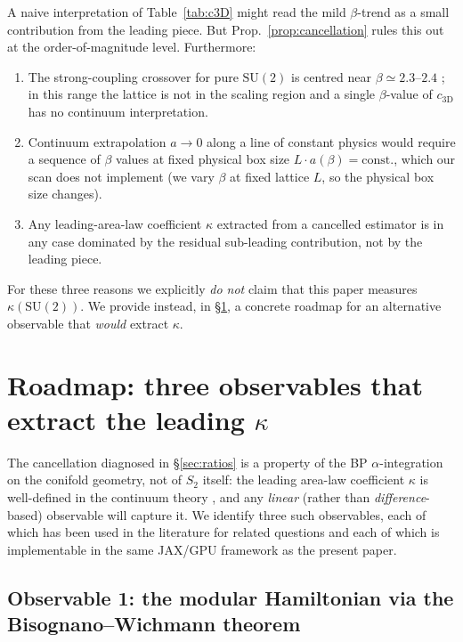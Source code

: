 \documentclass[11pt,a4paper]{article}
\theoremstyle{definition}
\newcommand{\SUtwo}{\mathrm{SU}(2)}
\newcommand{\threeD}{{3\text{D}}}
\begin{document}
A naive interpretation of Table~\ref{tab:c3D} might read the mild
$\beta$-trend as a small contribution from the leading piece. But
Prop.~\ref{prop:cancellation} rules this out at the order-of-magnitude
level. Furthermore:
\begin{enumerate}[leftmargin=*]
\item The strong-coupling crossover for pure $\SUtwo$ is centred near
      $\beta\simeq 2.3$--$2.4$ \cite{LuciniTeperWenger2005}; in this
      range the lattice is not in the scaling region and a single
      $\beta$-value of $c_{\threeD}$ has no continuum interpretation.
\item Continuum extrapolation $a\to 0$ along a line of constant
      physics would require a sequence of $\beta$ values at fixed
      physical box size $L \cdot a(\beta) = \mathrm{const.}$, which
      our scan does not implement (we vary $\beta$ at fixed lattice
      $L$, so the physical box size changes).
\item Any leading-area-law coefficient $\kappa$ extracted from a
      cancelled estimator is in any case dominated by the
      residual sub-leading contribution, not by the leading piece.
\end{enumerate}
For these three reasons we explicitly \emph{do not} claim that this
paper measures $\kappa(\SUtwo)$. We provide instead, in
\S\ref{sec:roadmap}, a concrete roadmap for an alternative
observable that \emph{would} extract $\kappa$.


\section{Roadmap: three observables that extract the leading
$\kappa$}
\label{sec:roadmap}

The cancellation diagnosed in \S\ref{sec:ratios} is a property of the
BP $\alpha$-integration on the conifold geometry, not of $S_{2}$
itself: the leading area-law coefficient $\kappa$ is well-defined in
the continuum theory \cite{Solodukhin2011,CasiniHuerta2009}, and any
\emph{linear} (rather than \emph{difference}-based) observable will
capture it. We identify three such observables, each of which has
been used in the literature for related questions and each of which
is implementable in the same JAX/GPU framework as the present
paper.

\subsection{Observable 1: the modular Hamiltonian via the
Bisognano--Wichmann theorem}
\label{sec:modH}
\end{document}

